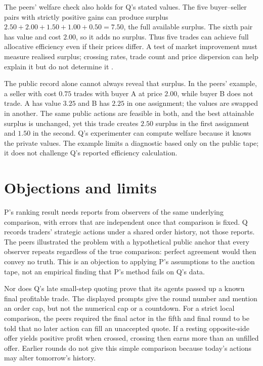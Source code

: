 \documentclass{article}
\begin{document}
The peers' welfare check also holds for Q's stated values. The five buyer--seller pairs with strictly
positive gains can produce surplus \(2.50+2.00+1.50+1.00+0.50=7.50\), the full available surplus. The
sixth pair has value and cost \(2.00\), so it adds no surplus. Thus five trades can achieve full
allocative efficiency even if their prices differ. A test of market improvement must measure realised
surplus; crossing rates, trade count and price dispersion can help explain it but do not determine it
\cite{Q}.

The public record alone cannot always reveal that surplus. In the peers' example, a seller with cost
\(0.75\) trades with buyer A at price \(2.00\), while buyer B does not trade. A has value \(3.25\) and B
has \(2.25\) in one assignment; the values are swapped in another. The same public actions are feasible
in both, and the best attainable surplus is unchanged, yet this trade creates \(2.50\) surplus in the
first assignment and \(1.50\) in the second. Q's experimenter can compute welfare because it knows the
private values. The example limits a diagnostic based only on the public tape; it does not challenge Q's
reported efficiency calculation.

\section{Objections and limits}

P's ranking result needs reports from observers of the same underlying comparison, with errors that are
independent once that comparison is fixed. Q records traders' strategic actions under a shared order
history, not those reports. The peers illustrated the problem with a hypothetical public anchor that
every observer repeats regardless of the true comparison: perfect agreement would then convey no truth.
This is an objection to applying P's assumptions to the auction tape, not an empirical finding that P's
method fails on Q's data.

Nor does Q's late small-step quoting prove that its agents passed up a known final profitable trade. The
displayed prompts give the round number and mention an order cap, but not the numerical cap or a
countdown. For a strict local comparison, the peers required the final actor in the fifth and final round
to be told that no later action can fill an unaccepted quote. If a resting opposite-side offer yields
positive profit when crossed, crossing then earns more than an unfilled offer. Earlier rounds do not give
this simple comparison because today's actions may alter tomorrow's history.
\end{document}
